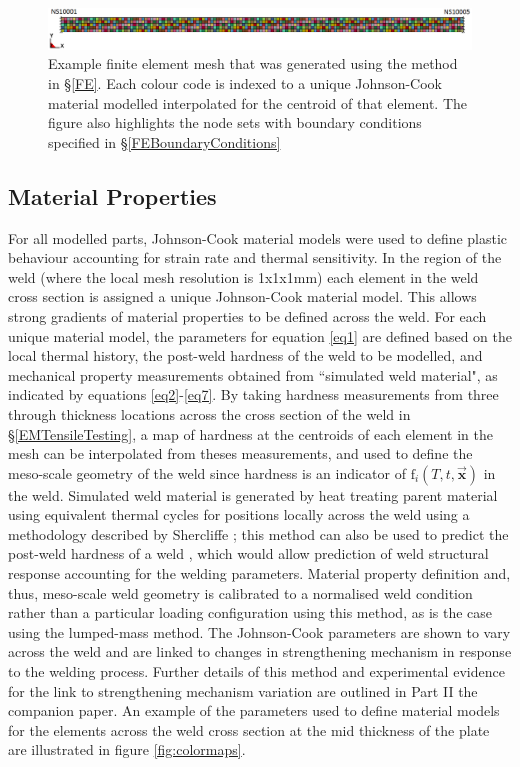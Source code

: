 \begin{figure}[h!]
	\centering
	\includegraphics[width=1\linewidth]{uniaxial_load}
	\caption[Mesh]{Example finite element mesh that was generated using the method in \S \ref{FE}. Each colour code is indexed to a unique Johnson-Cook material modelled interpolated for the centroid of that element. The figure also highlights the node sets with boundary conditions specified in \S \ref{FEBoundaryConditions}}	
	\label{fig:UniaxialMesh}
\end{figure} 
\subsection{Material Properties}
\label{FEMaterialProperties}
For all modelled parts, Johnson-Cook material models were used to define plastic behaviour accounting for strain rate and thermal sensitivity. In the region of the weld (where the local mesh resolution is 1x1x1mm) each element in the weld cross section is assigned a unique Johnson-Cook material model. This allows strong gradients of material properties to be defined across the weld. For each unique material model, the parameters for equation \ref{eq1} are defined based on the local thermal history, the post-weld hardness of the weld to be modelled, and mechanical property measurements obtained from ``simulated weld material", as indicated by equations \ref{eq2}-\ref{eq7}. By taking hardness measurements from three through thickness locations across the cross section of the weld in \S\ref{EMTensileTesting}, a map of hardness at the centroids of each element in the mesh can be interpolated from theses measurements, and used to define the meso-scale geometry of the weld since hardness is an indicator of $\textrm{f}_i(T,t,\vec{\textbf{x}})$ in the weld. Simulated weld material is generated by heat treating parent material using equivalent thermal cycles for positions locally across the weld using a methodology described by Shercliffe \cite{Shercliff1990,Shercliff1990a}; this method can also be used to predict the post-weld hardness of a weld \cite{Robson2006a,Sullivan2011}, which would allow prediction of weld structural response accounting for the welding parameters. Material property definition and, thus, meso-scale weld geometry is calibrated to a normalised weld condition rather than a particular loading configuration using this method, as is the case using the lumped-mass method. The Johnson-Cook parameters are shown to vary across the weld and are linked to changes in strengthening mechanism in response to the welding process. Further details of this method and experimental evidence for the link to strengthening mechanism variation are outlined in Part II the companion paper. An example of the parameters used to define material models for the elements across the weld cross section at the mid thickness of the plate are illustrated in figure \ref{fig:colormaps}.
